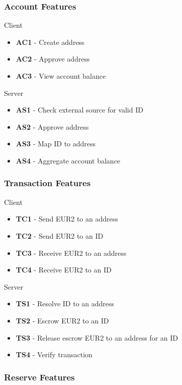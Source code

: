 \documentclass[12pt]{article} %
\begin{document}
{{\subsubsection{Account Features} \label{sssec:3.3:accounts}

Client
\begin{itemize}
	\item \textbf{AC1} - Create address
	\item \textbf{AC2} - Approve address
	\item \textbf{AC3} - View account balance
\end{itemize}

Server
\begin{itemize}
	\item \textbf{AS1} - Check external source for valid ID
	\item \textbf{AS2} - Approve address
	\item \textbf{AS3} - Map ID to address
	\item \textbf{AS4} - Aggregate account balance
\end{itemize}

\subsubsection{Transaction Features} \label{sssec:3.3:transactions}

Client
\begin{itemize}
	\item \textbf{TC1} - Send EUR2 to an address
	\item \textbf{TC2} - Send EUR2 to an ID
	\item \textbf{TC3} - Receive EUR2 to an address
	\item \textbf{TC4} - Receive EUR2 to an ID
\end{itemize}

Server
\begin{itemize}
	\item \textbf{TS1} - Resolve ID to an address
	\item \textbf{TS2} - Escrow EUR2 to an ID
	\item \textbf{TS3} - Release escrow EUR2 to an address for an ID
	\item \textbf{TS4} - Verify transaction
\end{itemize}

\subsubsection{Reserve Features} \label{sssec:3.3:reserve}

}}
\end{document}

